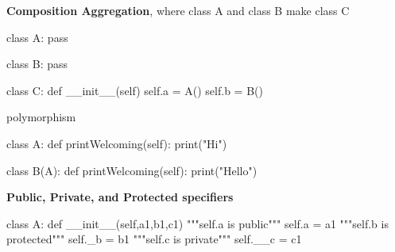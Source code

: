 	\textbf{Composition Aggregation}, where class A and class B make class C
	
\begin{python}
class A:
pass

class B:
pass

class C:
def __init__(self)
self.a = A()
self.b = B()
\end{python}
	
	polymorphism
\begin{python}
class A:
	def printWelcoming(self):
		print("Hi")
	
class B(A):
	def printWelcoming(self):
		print("Hello")
\end{python}

	\textbf{Public, Private, and Protected specifiers}

\begin{python}
class A:
	def __init__(self,a1,b1,c1)
		"""self.a is public"""
		self.a = a1
		"""self.b is protected"""
		self._b = b1
		"""self.c is private"""
		self.__c = c1
	
\end{python}